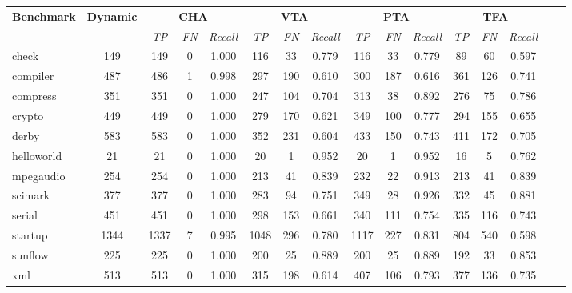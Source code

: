 \documentclass{fac}
\begin{document}
\begin{table} %
\centering
\begin{threeparttable}[b]
\begin{tabular*}{0.98\textwidth}{|l|c|c|c|c|c|c|c|c|c|c|c|c|c|c|c|}
	\hline
	\multirow{2}{*}{\textbf{Benchmark}} & \multirow{2}{*}{\textbf{Dynamic}\hspace{-1pt}} & \multicolumn{3}{c|}{\textbf{CHA}} & \multicolumn{3}{c|}{\textbf{VTA}} & \multicolumn{3}{c|}{\textbf{PTA}} & \multicolumn{3}{c|}{\textbf{TFA}}\\
\cline{3-14} &  & \textit{TP} & \textit{FN} & \textit{Recall} & \textit{TP} & \textit{FN} & \textit{Recall}& \textit{TP} & \textit{FN} & \textit{Recall} & \textit{TP} & \textit{FN}\hspace{-1pt} & \hspace{-1pt}\textit{Recall}\hspace{-1pt}\\
	\hline
	\hline
check & 149 & 149 & 0 & 1.000 & 116 & 33 & 0.779 & 116 & 33 & 0.779 & 89 & 60 & 0.597\\
compiler & 487 & 486 & 1 & 0.998 & 297 & 190 & 0.610 & 300 & 187 & 0.616 & 361 & 126 & 0.741\\
compress & 351 & 351 & 0 & 1.000 & 247 & 104 & 0.704 & 313 & 38 & 0.892 & 276 & 75 & 0.786\\
crypto & 449 & 449 & 0 & 1.000 & 279 & 170 & 0.621 & 349 & 100 & 0.777 & 294 & 155 & 0.655\\
derby & 583 & 583 & 0 & 1.000 & 352 & 231 & 0.604 & 433 & 150 & 0.743 & 411 & 172 & 0.705\\
helloworld & 21 & 21 & 0 & 1.000 & 20 & 1 & 0.952 & 20 & 1 & 0.952 & 16 & 5 & 0.762\\
mpegaudio & 254 & 254 & 0 & 1.000 & 213 & 41 & 0.839 & 232 & 22 & 0.913 & 213 & 41 & 0.839\\
scimark & 377 & 377 & 0 & 1.000 & 283 & 94 & 0.751 & 349 & 28 & 0.926 & 332 & 45 & 0.881\\
serial & 451 & 451 & 0 & 1.000 & 298 & 153 & 0.661 & 340 & 111 & 0.754 & 335 & 116 & 0.743\\
startup & 1344 & 1337 & 7 & 0.995 & 1048 & 296 & 0.780 & 1117 & 227 & 0.831 & 804 & 540 & 0.598\\
sunflow & 225 & 225 & 0 & 1.000 & 200 & 25 & 0.889 & 200 & 25 & 0.889 & 192 & 33 & 0.853\\
xml & 513 & 513 & 0 & 1.000 & 315 & 198 & 0.614 & 407 & 106 & 0.793 & 377 & 136 & 0.735\\
\hline

\end{tabular*}
\end{threeparttable}
\end{table}
\end{document}
